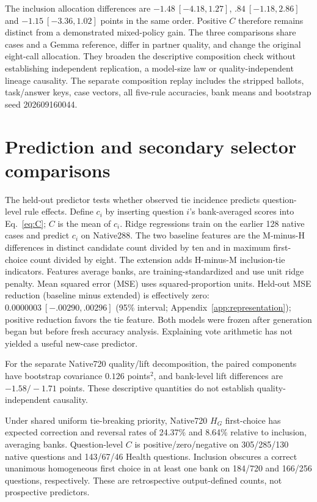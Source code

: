 The inclusion allocation differences are $-1.48\ [-4.18,1.27]$, $.84\ [-1.18,2.86]$ and $-1.15\ [-3.36,1.02]$ points in the same order. Positive $C$ therefore remains distinct from a demonstrated mixed-policy gain. The three comparisons share cases and a Gemma reference, differ in partner quality, and change the original eight-call allocation. They broaden the descriptive composition check without establishing independent replication, a model-size law or quality-independent lineage causality. The separate composition replay includes the stripped ballots, task/answer keys, case vectors, all five-rule accuracies, bank means and bootstrap seed 202609160044.

\section{Prediction and secondary selector comparisons}\label{app:readability_detail}

The held-out predictor tests whether observed tie incidence predicts question-level rule effects. Define $c_i$ by inserting question $i$'s bank-averaged scores into Eq.~\ref{eq:C}; $C$ is the mean of $c_i$. Ridge regressions train on the earlier 128 native cases and predict $c_i$ on Native288. The two baseline features are the M-minus-H differences in distinct candidate count divided by ten and in maximum first-choice count divided by eight. The extension adds H-minus-M inclusion-tie indicators. Features average banks, are training-standardized and use unit ridge penalty. Mean squared error (MSE) uses squared-proportion units. Held-out MSE reduction (baseline minus extended) is effectively zero: $0.0000003\ [-.00290,.00296]$ (95\% interval; Appendix~\ref{app:representation}); positive reduction favors the tie feature. Both models were frozen after generation began but before fresh accuracy analysis. Explaining vote arithmetic has not yielded a useful new-case predictor.

For the separate Native720 quality/lift decomposition, the paired components have bootstrap covariance $0.126$ points$^2$, and bank-level lift differences are $-1.58/-1.71$ points. These descriptive quantities do not establish quality-independent causality.

Under shared uniform tie-breaking priority, Native720 $H_G$ first-choice has expected correction and reversal rates of 24.37\% and 8.64\% relative to inclusion, averaging banks. Question-level $C$ is positive/zero/negative on 305/285/130 native questions and 143/67/46 Health questions. Inclusion obscures a correct unanimous homogeneous first choice in at least one bank on 184/720 and 166/256 questions, respectively. These are retrospective output-defined counts, not prospective predictors.

